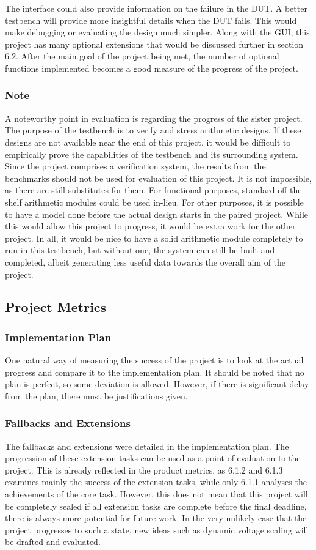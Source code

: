 The interface could also provide information on the failure in the DUT.
A better testbench will provide more insightful details when the DUT fails.
This would make debugging or evaluating the design much simpler.
Along with the GUI, this project has many optional extensions that would be
discussed further in section 6.2.
After the main goal of the project being met, the number of optional functions
implemented becomes a good measure of the progress of the project.

\subsubsection{Note}
A noteworthy point in evaluation is regarding the progress of the sister project.
The purpose of the testbench is to verify and stress arithmetic designs.
If these designs are not available near the end of this project,
it would be difficult to empirically prove the capabilities of the testbench
and its surrounding system.
Since the project comprises a verification system, the results from the
benchmarks should not be used for evaluation of this project.
It is not impossible, as there are still substitutes for them.
For functional purposes, standard off-the-shelf arithmetic modules could be
used in-lieu.
For other purposes, it is possible to have a model done before the actual design
starts in the paired project.
While this would allow this project to progress, it would be extra work
for the other project.
In all, it would be nice to have a solid arithmetic module completely to run
in this testbench, but without one, the system can still be built and completed,
albeit generating less useful data towards the overall aim of the project.

\subsection{Project Metrics}
\subsubsection{Implementation Plan}
One natural way of measuring the success of the project is to look at the actual
progress and compare it to the implementation plan.
It should be noted that no plan is perfect, so some deviation is allowed.
However, if there is significant delay from the plan, there must be
justifications given.

\subsubsection{Fallbacks and Extensions}
The fallbacks and extensions were detailed in the implementation plan.
The progression of these extension tasks can be used as a point of evaluation
to the project.
This is already reflected in the product metrics, as 6.1.2 and 6.1.3 examines
mainly the success of the extension tasks, while only 6.1.1 analyses the
achievements of the core task.
However, this does not mean that this project will be completely sealed if
all extension tasks are complete before the final deadline, there is always
more potential for future work.
In the very unlikely case that the project progresses to such a state, new ideas
such as dynamic voltage scaling will be drafted and evaluated.
